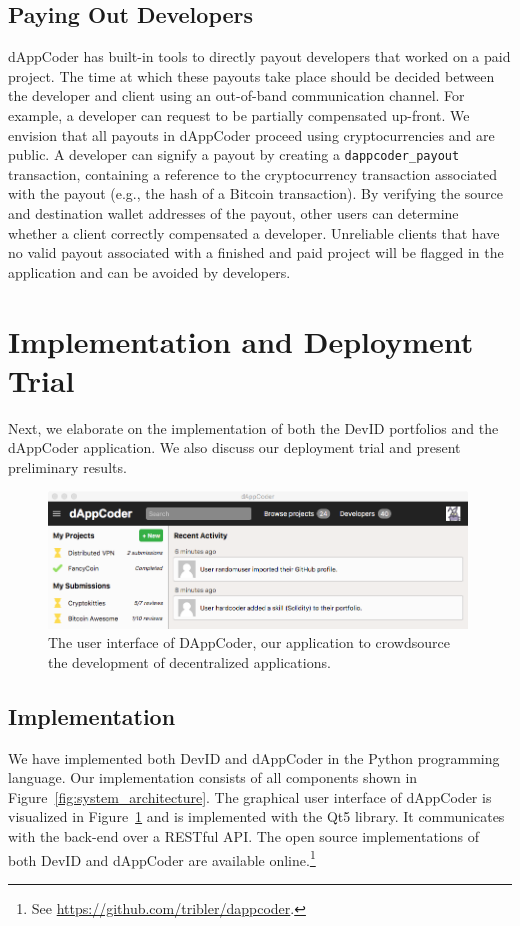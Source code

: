 \subsection{Paying Out Developers}
\label{subsec:dappcoder_payout}
dAppCoder has built-in tools to directly payout developers that worked on a paid project.
The time at which these payouts take place should be decided between the developer and client using an out-of-band communication channel.
For example, a developer can request to be partially compensated up-front.
We envision that all payouts in dAppCoder proceed using cryptocurrencies and are public.
A developer can signify a payout by creating a \texttt{dappcoder\_payout} transaction, containing a reference to the cryptocurrency transaction associated with the payout (e.g., the hash of a Bitcoin transaction).
By verifying the source and destination wallet addresses of the payout, other users can determine whether a client correctly compensated a developer.
Unreliable clients that have no valid payout associated with a finished and paid project will be flagged in the application and can be avoided by developers.

\section{Implementation and Deployment Trial}
\label{sec:experiments}
Next, we elaborate on the implementation of both the DevID portfolios and the dAppCoder application.
We also discuss our deployment trial and present preliminary results.

\begin{figure}[t!]
	\centering
	\includegraphics[width=0.99\textwidth]{devid/resources/gui_smaller.png}
	\caption{The user interface of DAppCoder, our application to crowdsource the development of decentralized applications.}
	\label{fig:dappcoder}
\end{figure}

\subsection{Implementation}
We have implemented both DevID and dAppCoder in the Python programming language.
Our implementation consists of all components shown in Figure~\ref{fig:system_architecture}.
The graphical user interface of dAppCoder is visualized in Figure~\ref{fig:dappcoder} and is implemented with the Qt5 library.
It communicates with the back-end over a RESTful API.
The open source implementations of both DevID and dAppCoder are available online.\footnote{See \url{https://github.com/tribler/dappcoder}.}

